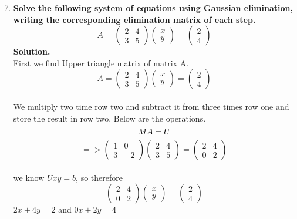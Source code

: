 \documentclass[12pt, oneside]{article}   	%
\begin{document}
\begin{enumerate}
\setcounter{enumi}{6}
\item \textbf{Solve the following system of equations using Gaussian elimination, writing the corresponding elimination matrix of each step.
$$
A = \left(\begin{array}{cc} 2 & 4\\ 3 & 5 \end{array}\right)
\left(\begin{array}{c} x\\ y \end{array}\right)
=\left(\begin{array}{c} 2\\ 4 \end{array}\right)
$$}
\textbf{Solution.}\\

First we find Upper triangle matrix of matrix A.\\

$$
A = \left(\begin{array}{cc} 2 & 4\\ 3 & 5 \end{array}\right)
\left(\begin{array}{c} x\\ y \end{array}\right)
=\left(\begin{array}{c} 2\\ 4 \end{array}\right)
$$\\

We multiply two time row two and subtract it from three times row one  and store the result in row two. Below are the operations.\\
$$
MA =U\\ 
$$
$$
=>\left(\begin{array}{cc} 1&0\\ 3& -2 \end{array}\right)
\left(\begin{array}{cc} 2 & 4\\ 3 & 5 \end{array}\right)
=\left(\begin{array}{cc} 2 &4\\ 0&2 \end{array}\right)
$$\\

 we know $Uxy=b$, so therefore\\
 $$
 \left(\begin{array}{cc} 2 &4\\ 0&2 \end{array}\right)
 \left(\begin{array}{c} x\\ y \end{array}\right)
 =\left(\begin{array}{c} 2\\ 4 \end{array}\right) 
 $$
 $2x+4y=2$ and  $0x+2y=4$\\
 

\end{enumerate}
\end{document}
